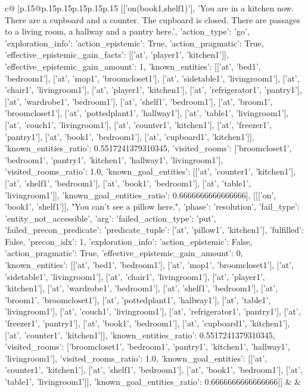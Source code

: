 \documentclass{article}
\begin{document}
{\begin{supertabular}{c@{$\;$}|p{.15\linewidth}@{}p{.15\linewidth}p{.15\linewidth}p{.15\linewidth}p{.15\linewidth}p{.15\linewidth}}
{{{[['on(book1,shelf1)'], 'You are in a kitchen now. There are a cupboard and a counter. The cupboard is closed. There are passages to a living room, a hallway and a pantry here.', {'action_type': 'go', 'exploration_info': {'action_epistemic': True, 'action_pragmatic': True, 'effective_epistemic_gain_facts': [['at', 'player1', 'kitchen1']], 'effective_epistemic_gain_amount': 1, 'known_entities': [['at', 'bed1', 'bedroom1'], ['at', 'mop1', 'broomcloset1'], ['at', 'sidetable1', 'livingroom1'], ['at', 'chair1', 'livingroom1'], ['at', 'player1', 'kitchen1'], ['at', 'refrigerator1', 'pantry1'], ['at', 'wardrobe1', 'bedroom1'], ['at', 'shelf1', 'bedroom1'], ['at', 'broom1', 'broomcloset1'], ['at', 'pottedplant1', 'hallway1'], ['at', 'table1', 'livingroom1'], ['at', 'couch1', 'livingroom1'], ['at', 'counter1', 'kitchen1'], ['at', 'freezer1', 'pantry1'], ['at', 'book1', 'bedroom1'], ['at', 'cupboard1', 'kitchen1']], 'known_entities_ratio': 0.5517241379310345, 'visited_rooms': ['broomcloset1', 'bedroom1', 'pantry1', 'kitchen1', 'hallway1', 'livingroom1'], 'visited_rooms_ratio': 1.0, 'known_goal_entities': [['at', 'counter1', 'kitchen1'], ['at', 'shelf1', 'bedroom1'], ['at', 'book1', 'bedroom1'], ['at', 'table1', 'livingroom1']], 'known_goal_entities_ratio': 0.6666666666666666}}], [[['on', 'book1', 'shelf1']], "You can't see a pillow here.", {'phase': 'resolution', 'fail_type': 'entity_not_accessible', 'arg': {'failed_action_type': 'put', 'failed_precon_predicate': {'predicate_tuple': ['at', 'pillow1', 'kitchen1'], 'fulfilled': False, 'precon_idx': 1}}, 'exploration_info': {'action_epistemic': False, 'action_pragmatic': True, 'effective_epistemic_gain_amount': 0, 'known_entities': [['at', 'bed1', 'bedroom1'], ['at', 'mop1', 'broomcloset1'], ['at', 'sidetable1', 'livingroom1'], ['at', 'chair1', 'livingroom1'], ['at', 'player1', 'kitchen1'], ['at', 'wardrobe1', 'bedroom1'], ['at', 'shelf1', 'bedroom1'], ['at', 'broom1', 'broomcloset1'], ['at', 'pottedplant1', 'hallway1'], ['at', 'table1', 'livingroom1'], ['at', 'couch1', 'livingroom1'], ['at', 'refrigerator1', 'pantry1'], ['at', 'freezer1', 'pantry1'], ['at', 'book1', 'bedroom1'], ['at', 'cupboard1', 'kitchen1'], ['at', 'counter1', 'kitchen1']], 'known_entities_ratio': 0.5517241379310345, 'visited_rooms': ['broomcloset1', 'bedroom1', 'pantry1', 'kitchen1', 'hallway1', 'livingroom1'], 'visited_rooms_ratio': 1.0, 'known_goal_entities': [['at', 'counter1', 'kitchen1'], ['at', 'shelf1', 'bedroom1'], ['at', 'book1', 'bedroom1'], ['at', 'table1', 'livingroom1']], 'known_goal_entities_ratio': 0.6666666666666666}}]] 
	  } 
	   } 
	   } 
	 & & \\ 
 


\end{supertabular}}
\end{document}
